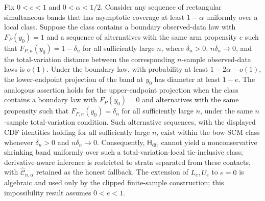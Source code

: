 Fix \(0<e<1\) and \(0<\alpha<1/2\). Consider any sequence of rectangular simultaneous bands that has asymptotic coverage at least \(1-\alpha\) uniformly over a local class. Suppose the class contains a boundary observed-data law with \(F_P(y_0)=1\) and a sequence of alternatives with the same arm propensity \(e\) such that \(F_{P,n}(y_0)=1-\delta_n\) for all sufficiently large \(n\), where \(\delta_n>0\), \(n\delta_n\to0\), and the total-variation distance between the corresponding \(n\)-sample observed-data laws is \(o(1)\). Under the boundary law, with probability at least \(1-2\alpha-o(1)\), the lower-endpoint projection of the band at \(y_0\) has diameter at least \(1-e\). The analogous assertion holds for the upper-endpoint projection when the class contains a boundary law with \(F_P(y_0)=0\) and alternatives with the same propensity such that \(F_{P,n}(y_0)=\delta_n\) for all sufficiently large \(n\), under the same \(n\)-sample total-variation condition. Such alternative sequences, with the displayed CDF identities holding for all sufficiently large \(n\), exist within the bow-SCM class whenever \(\delta_n>0\) and \(n\delta_n\to0\). Consequently, \(\mathsf H_{\mathrm{dir}}\) cannot yield a nonconservative shrinking band uniformly over such a total-variation-local tie-inclusive class; derivative-aware inference is restricted to strata separated from these contacts, with \(\widehat{\mathcal C}_{n,\alpha}\) retained as the honest fallback. The extension of \(L_e,U_e\) to \(e=0\) is algebraic and used only by the clipped finite-sample construction; this impossibility result assumes \(0<e<1\).